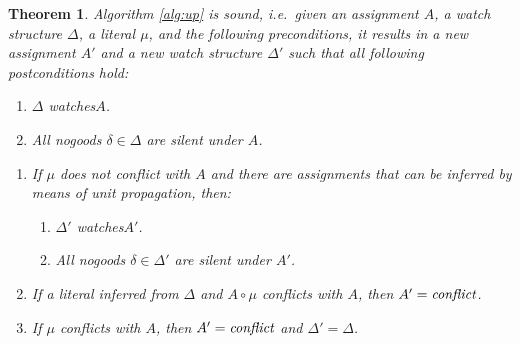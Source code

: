 \documentclass{vutinfth} %
\newtheorem{theorem}{Theorem}[section]
\newcommand{\ass}{A}
\newcommand{\lowinv}{watches\xspace}
\newcommand{\sgl}{\mu}
\begin{document}
\begin{theorem}
Algorithm \ref{alg:up} is sound, i.e.~given an assignment $\ass$, a watch structure $\Delta$, a literal $\sgl$, and the following preconditions, it results in a new assignment $\ass'$ and a new watch structure $\Delta'$ such that all following postconditions hold:

\begin{enumerate}[label={\normalfont (\textsc{Pre}\arabic*)},ref=(\textsc{Pre}\arabic*)]
\item $\Delta$ \lowinv $A$. \label{up:sound:pre2}
\item All nogoods $\delta \in \Delta$ are silent under $\ass$. \label{up:sound:pre1}
\end{enumerate}

\begin{enumerate}[label={\normalfont (\textsc{Post}\arabic*)},ref=(\textsc{Post}\arabic*)]
\item If $\sgl$ does not conflict with $\ass$ and there are assignments that can be inferred by means of unit propagation, then: \label{up:sound:post2}
\begin{enumerate}[label={\normalfont (\alph*)},ref=\theenumi(\alph*)]
\item $\Delta'$ \lowinv $\ass'$. \label{up:sound:post2b}
\item All nogoods $\delta \in \Delta'$ are silent under $\ass'$. \label{up:sound:post2a}
\end{enumerate}
\item If a literal inferred from $\Delta$ and $\ass \circ \sgl$ conflicts with $\ass$, then $\ass' = \emph{conflict}$. \label{up:sound:post3}
\item If $\sgl$ conflicts with $\ass$, then $\ass' = \emph{conflict}$ and $\Delta' = \Delta$. \label{up:sound:post1}%
\end{enumerate}
\end{theorem}
\end{document}
